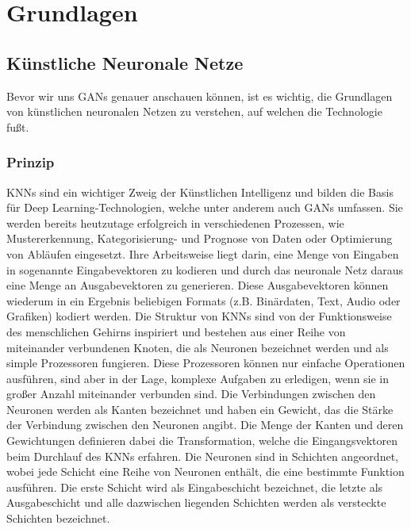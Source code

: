 \chapter{Grundlagen}

\section{Künstliche Neuronale Netze}

\noindent Bevor wir uns GANs genauer anschauen können, ist es wichtig, die Grundlagen von künstlichen neuronalen Netzen zu verstehen, auf welchen die Technologie fußt.

\subsection{Prinzip}

\noindent \acp{KNN} sind ein wichtiger Zweig der Künstlichen Intelligenz und bilden die Basis für Deep Learning-Technologien, welche unter anderem auch GANs umfassen. Sie werden bereits heutzutage erfolgreich in verschiedenen Prozessen, wie Mustererkennung, Kategorisierung- und Prognose von Daten oder Optimierung von Abläufen eingesetzt. Ihre Arbeitsweise liegt darin, eine Menge von Eingaben in sogenannte Eingabevektoren zu kodieren und durch das neuronale Netz daraus eine Menge an Ausgabevektoren zu generieren. Diese Ausgabevektoren können wiederum in ein Ergebnis beliebigen Formats (z.B. Binärdaten, Text, Audio oder Grafiken) kodiert werden. Die Struktur von \acp{KNN} sind von der Funktionsweise des menschlichen Gehirns inspiriert und bestehen aus einer Reihe von miteinander verbundenen Knoten, die als Neuronen bezeichnet werden und als simple Prozessoren fungieren. Diese Prozessoren können nur einfache Operationen ausführen, sind aber in der Lage, komplexe Aufgaben zu erledigen, wenn sie in großer Anzahl miteinander verbunden sind. Die Verbindungen zwischen den Neuronen werden als Kanten bezeichnet und haben ein Gewicht, das die Stärke der Verbindung zwischen den Neuronen angibt. Die Menge der Kanten und deren Gewichtungen definieren dabei die Transformation, welche die Eingangsvektoren beim Durchlauf des \ac{KNN}s erfahren. Die Neuronen sind in Schichten angeordnet, wobei jede Schicht eine Reihe von Neuronen enthält, die eine bestimmte Funktion ausführen. Die erste Schicht wird als Eingabeschicht bezeichnet, die letzte als Ausgabeschicht und alle dazwischen liegenden Schichten werden als versteckte Schichten bezeichnet.\cite{knnbook}\\

